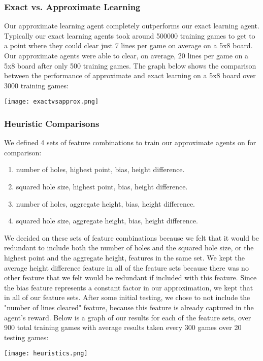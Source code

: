 \documentclass[10pt]{article}
\begin{document}
\subsubsection{Exact vs. Approximate Learning}
Our approximate learning agent completely outperforms our exact learning agent. Typically our exact learning agents took around 500000 training games to get to a point where they could clear just 7 lines per game on average on a 5x8 board. Our approximate agents were able to clear, on average, 20 lines per game on a 5x8 board after only 500 training games. The graph below shows the comparison between the performance of approximate and exact learning on a 5x8 board over 3000 training games:\\
\begin{center}
    \texttt{[image: exactvsapprox.png]}
\end{center}

\subsubsection{Heuristic Comparisons}
We defined 4 sets of feature combinations to train our approximate agents on for comparison:
\begin{enumerate}
    \item number of holes, highest point, bias, height difference.
    \item squared hole size, highest point, bias, height difference.
    \item number of holes, aggregate height, bias, height difference.
    \item squared hole size, aggregate height, bias, height difference.
\end{enumerate}
We decided on these sets of feature combinations because we felt that it would be redundant to include both the number of holes and the squared hole size, or the highest point and the aggregate height, features in the same set. We kept the average height difference feature in all of the feature sets because there was no other feature that we felt would be redundant if included with this feature. Since the bias feature represents a constant factor in our approximation, we kept that in all of our feature sets. After some initial testing, we chose to not include the "number of lines cleared" feature, because this feature is already captured in the agent's reward. Below is a graph of our results for each of the feature sets, over 900 total training games with average results taken every 300 games over 20 testing games:
\begin{center}
    \texttt{[image: heuristics.png]}
\end{center}
\end{document}
